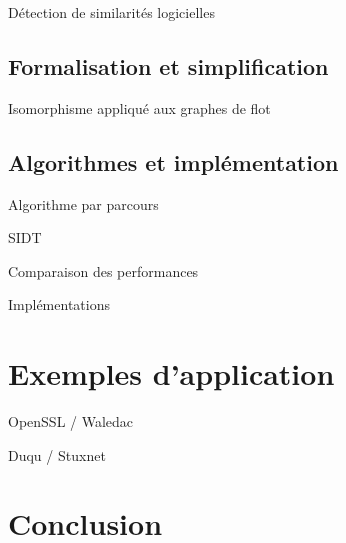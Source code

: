 \documentclass{beamer}
\begin{document}
\begin{frame}{}
\begin{frame}{Détection de similarités logicielles}
\end{frame}

\subsection{Formalisation et simplification}
\begin{frame}{Isomorphisme appliqué aux graphes de flot}

\end{frame}

\subsection{Algorithmes et implémentation}
\begin{frame}{Algorithme par parcours}

\end{frame}

\begin{frame}{SIDT}

\end{frame}

\begin{frame}{Comparaison des performances}

\end{frame}

\begin{frame}{Implémentations}

\end{frame}

\section{Exemples d'application}

\begin{frame}{OpenSSL / Waledac}

\end{frame}

\begin{frame}{Duqu / Stuxnet}

\end{frame}

\section{Conclusion}


\end{frame}
\end{document}
